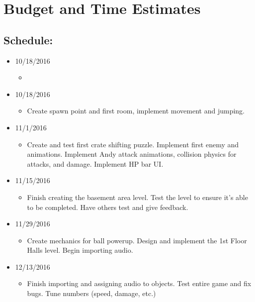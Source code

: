 \documentclass [12pt]{article}
\begin{document}
\section*{Budget and Time Estimates}

\subsection*{Schedule:}

\begin{itemize}
\item 10/18/2016
	\begin{itemize}
	\item
	\end{itemize}
\end{itemize}

\begin{itemize}
\item 10/18/2016
	\begin{itemize}
	\item Create spawn point and first room, implement movement and jumping.
	\end{itemize}
\item 11/1/2016
	\begin{itemize}
	\item Create and test first crate shifting puzzle. Implement first enemy and animations. Implement Andy attack animations, collision physics for attacks, and damage. Implement HP bar UI.
	\end{itemize}
\item 11/15/2016
	\begin{itemize}
	\item Finish creating the basement area level. Test the level to ensure it's able to be completed. Have others test and give feedback.
	\end{itemize}
\item 11/29/2016
	\begin{itemize}
	\item Create mechanics for ball powerup. Design and implement the 1st Floor Halls level. Begin importing audio.
	\end{itemize}
\item 12/13/2016
	\begin{itemize}
	\item Finish importing and assigning audio to objects. Test entire game and fix bugs. Tune numbers (speed, damage, etc.)
	\end{itemize}
\end{itemize}
\end{document}
